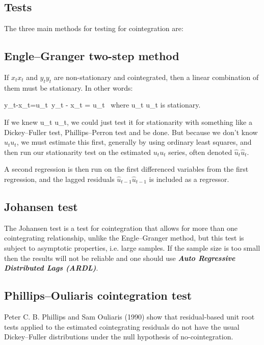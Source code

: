 \subsection*{Tests}
The three main methods for testing for cointegration are:

\subsection*{Engle–Granger two-step method}
If ${\displaystyle x_{t}} x_{t}$ and ${\displaystyle y_{t}} y_{t}$ are non-stationary and cointegrated, then a linear combination of them must be stationary. In other words:

{\displaystyle y_{t}-\beta x_{t}=u_{t}\,} 
y_t - \beta x_t = u_t \,
where {\displaystyle u_{t}} u_{t} is stationary.

If we knew {\displaystyle u_{t}} u_{t}, we could just test it for stationarity with something like a Dickey–Fuller test, Phillips–Perron test and be done. But because we don't know ${\displaystyle u_{t}} u_{t}$, we must estimate this first, generally by using ordinary least squares, and then run our stationarity test on the estimated ${\displaystyle u_{t}} u_{t}$ series, often denoted ${\displaystyle {\hat {u}}_{t}} \hat{u}_t$.

A second regression is then run on the first differenced variables from the first regression, and the lagged residuals ${\displaystyle {\hat {u}}_{t-1}} {\hat  {u}}_{{t-1}}$ is included as a regressor.

\subsection*{Johansen test}
The Johansen test is a test for cointegration that allows for more than one cointegrating relationship, unlike the Engle–Granger method, but this test is subject to asymptotic properties, i.e. large samples. If the sample size is too small then the results will not be reliable and one should use \textbf{\textit{Auto Regressive Distributed Lags (ARDL)}}.

\subsection*{Phillips–Ouliaris cointegration test}
Peter C. B. Phillips and Sam Ouliaris (1990) show that residual-based unit root tests applied to the estimated cointegrating residuals do not have the usual Dickey–Fuller distributions under the null hypothesis of no-cointegration.

